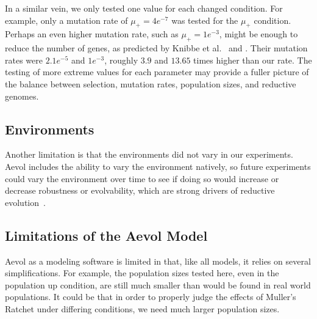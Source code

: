 In a similar vein, we only tested one value for each changed condition. For example, only a mutation rate of $\mu_+ = 4e^{-7}$ was tested for the $\mu_+$ condition. Perhaps an even higher mutation rate, such as $\mu_+ = 1e^{-3}$, might be enough to reduce the number of genes, as predicted by Knibbe et al.~\cite{Knibbe2007} and \cite{Liard.2018}. Their mutation rates were $2.1e^{-5}$ and $1e^{-3}$, roughly $3.9$ and $13.65$ times higher than our rate. The testing of more extreme values for each parameter may provide a fuller picture of the balance between selection, mutation rates, population sizes, and reductive genomes. 

\subsection{Environments}
Another limitation is that the environments did not vary in our experiments. Aevol includes the ability to vary the environment natively, so future experiments could vary the environment over time to see if doing so would increase or decrease robustness or evolvability, which are strong drivers of reductive evolution~\cite{Batut.2013}. 

\subsection{Limitations of the Aevol Model}
Aevol as a modeling software is limited in that, like all models, it relies on several simplifications. For example, the population sizes tested here, even in the population up condition, are still much smaller than would be found in real world populations. It could be that in order to properly judge the effects of Muller's Ratchet under differing conditions, we need much larger population sizes. 
